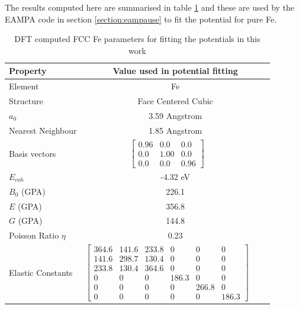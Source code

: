 The results computed here are summarised in table \ref{table:feinputparameters} and these are used by the EAMPA code in section \ref{section:eampause} to fit the potential for pure \Gls{Fe}.

\begin{table}[h]
\renewcommand{\arraystretch}{1.2}
\centering
\begin{tabular}{lccc}
\hline\hline
Property & \multicolumn{3}{c}{Value used in potential fitting} \\
\hline\hline
Element & \multicolumn{3}{c}{Fe}\\
Structure             & \multicolumn{3}{c}{Face Centered Cubic}\\
$a_0$                 & \multicolumn{3}{c}{3.59 Angstrom}\\
Nearest Neighbour     & \multicolumn{3}{c}{1.85 Angstrom}\\
Basis vectors         & $\begin{bmatrix} 0.96 & 0.0 & 0.0 \\ 0.0 & 1.00 & 0.0 \\ 0.0 & 0.0 & 0.96  \end{bmatrix}$ \\
$E_{coh}$             & \multicolumn{3}{c}{-4.32 eV}   \\
$B_0$ (GPA)           & \multicolumn{3}{c}{226.1}   \\
$E$ (GPA)             & \multicolumn{3}{c}{356.8}   \\
$G$ (GPA)             & \multicolumn{3}{c}{144.8}   \\
Poisson Ratio $\eta$  & \multicolumn{3}{c}{0.23}   \\
Elastic Constants     & $\begin{bmatrix} 364.6 & 141.6 & 233.8 & 0 & 0 & 0 \\ 141.6 & 298.7 & 130.4 & 0 & 0 & 0 \\ 233.8 & 130.4 & 364.6 & 0 & 0 & 0 \\ 0 & 0 & 0 & 186.3 & 0 & 0 \\ 0 & 0 & 0 & 0 & 266.8 & 0 \\ 0 & 0 & 0 & 0 & 0 & 186.3 \end{bmatrix}$ \\
\hline\hline
\end{tabular}
\caption{DFT computed FCC Fe parameters for fitting the potentials in this work}
\label{table:feinputparameters}
\end{table}




\FloatBarrier
